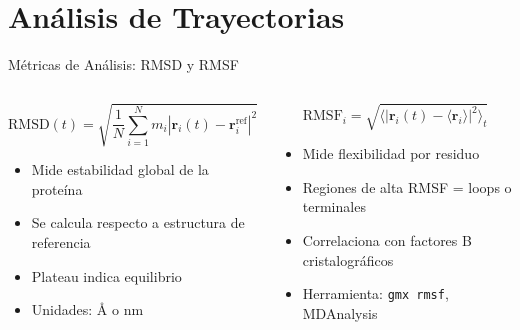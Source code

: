 \documentclass[aspectratio=169, 10pt]{beamer}
\begin{document}
\section{Análisis de Trayectorias}

\begin{frame}{Métricas de Análisis: RMSD y RMSF}

\begin{columns}[T]
\begin{tcolorbox}[formulabox, title={RMSD (Desviación Cuadrática Media)}, equal height group=ehg-rmsd]
\[
\text{RMSD}(t) = \sqrt{\frac{1}{N}\sum_{i=1}^{N} m_i \left|\mathbf{r}_i(t) - \mathbf{r}_i^{\text{ref}}\right|^2}
\]
\small
\begin{itemize}
  \item Mide estabilidad global de la proteína
  \item Se calcula respecto a estructura de referencia
  \item Plateau indica equilibrio
  \item Unidades: Å o nm
\end{itemize}
\end{tcolorbox}

\begin{tcolorbox}[formulabox, title={RMSF (Fluctuación Cuadrática Media)}, equal height group=ehg-rmsd]
\[
\text{RMSF}_i = \sqrt{\langle \left|\mathbf{r}_i(t) - \langle\mathbf{r}_i\rangle\right|^2 \rangle_t}
\]
\small
\begin{itemize}
  \item Mide flexibilidad por residuo
  \item Regiones de alta RMSF = loops o terminales
  \item Correlaciona con factores B cristalográficos
  \item Herramienta: \texttt{gmx rmsf}, MDAnalysis
\end{itemize}
\end{tcolorbox}
\end{columns}
\end{frame}
\end{document}
